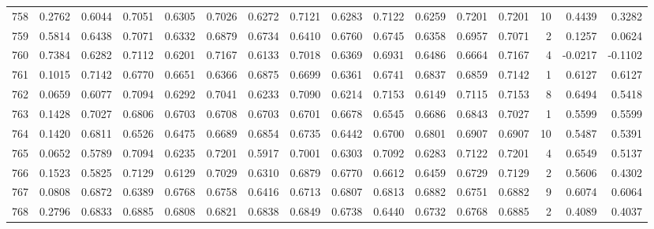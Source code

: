 \begin{tabular}{lrrrrrrrrrrrrrrr}
758 &      0.2762 &  0.6044 &  0.7051 &  0.6305 &  0.7026 &  0.6272 &  0.7121 &  0.6283 &  0.7122 &  0.6259 &   0.7201 &     0.7201 &     10 &                    0.4439 &                     0.3282 \\
759 &      0.5814 &  0.6438 &  0.7071 &  0.6332 &  0.6879 &  0.6734 &  0.6410 &  0.6760 &  0.6745 &  0.6358 &   0.6957 &     0.7071 &      2 &                    0.1257 &                     0.0624 \\
760 &      0.7384 &  0.6282 &  0.7112 &  0.6201 &  0.7167 &  0.6133 &  0.7018 &  0.6369 &  0.6931 &  0.6486 &   0.6664 &     0.7167 &      4 &                   -0.0217 &                    -0.1102 \\
761 &      0.1015 &  0.7142 &  0.6770 &  0.6651 &  0.6366 &  0.6875 &  0.6699 &  0.6361 &  0.6741 &  0.6837 &   0.6859 &     0.7142 &      1 &                    0.6127 &                     0.6127 \\
762 &      0.0659 &  0.6077 &  0.7094 &  0.6292 &  0.7041 &  0.6233 &  0.7090 &  0.6214 &  0.7153 &  0.6149 &   0.7115 &     0.7153 &      8 &                    0.6494 &                     0.5418 \\
763 &      0.1428 &  0.7027 &  0.6806 &  0.6703 &  0.6708 &  0.6703 &  0.6701 &  0.6678 &  0.6545 &  0.6686 &   0.6843 &     0.7027 &      1 &                    0.5599 &                     0.5599 \\
764 &      0.1420 &  0.6811 &  0.6526 &  0.6475 &  0.6689 &  0.6854 &  0.6735 &  0.6442 &  0.6700 &  0.6801 &   0.6907 &     0.6907 &     10 &                    0.5487 &                     0.5391 \\
765 &      0.0652 &  0.5789 &  0.7094 &  0.6235 &  0.7201 &  0.5917 &  0.7001 &  0.6303 &  0.7092 &  0.6283 &   0.7122 &     0.7201 &      4 &                    0.6549 &                     0.5137 \\
766 &      0.1523 &  0.5825 &  0.7129 &  0.6129 &  0.7029 &  0.6310 &  0.6879 &  0.6770 &  0.6612 &  0.6459 &   0.6729 &     0.7129 &      2 &                    0.5606 &                     0.4302 \\
767 &      0.0808 &  0.6872 &  0.6389 &  0.6768 &  0.6758 &  0.6416 &  0.6713 &  0.6807 &  0.6813 &  0.6882 &   0.6751 &     0.6882 &      9 &                    0.6074 &                     0.6064 \\
768 &      0.2796 &  0.6833 &  0.6885 &  0.6808 &  0.6821 &  0.6838 &  0.6849 &  0.6738 &  0.6440 &  0.6732 &   0.6768 &     0.6885 &      2 &                    0.4089 &                     0.4037 \\

\end{tabular}
